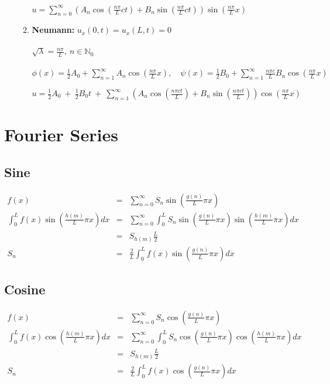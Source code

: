\documentclass[12pt]{article}
\newcommand\bitalicmath{\mathversion{bitalic}}
\begin{document}
\begin{enumerate}
\begin{enumerate}
		$u =  \displaystyle\sum\limits_{n = 0}^{\infty} \left(A_n \cos(\frac{n\pi}{L}ct) + B_n\sin(\frac{n\pi}{L}ct)\right)\sin(\frac{n\pi}{L}x)$ \\
		\item {\bf Neumann: }{\bitalicmath $ u_x(0,t) = u_x(L,t) = 0$} \\ \\
		$\sqrt{\lambda} = \displaystyle \frac{n\pi}{L},\ n \in \mathbb{N}_0$ \\ \\
		$\phi(x) = \frac{1}{2}A_0 + \sum\limits_{n = 1}^{\infty} A_n\cos(\frac{n\pi}{L}x),\quad \psi(x) = \frac{1}{2}B_0 + \sum\limits_{n = 1}^{\infty} \frac{n\pi c}{L} B_n\cos(\frac{n\pi}{L}x)$
	
		$u =  \displaystyle\frac{1}{2}A_0\  +\  \frac{1}{2}B_0 t\  +\  \sum\limits_{n = 1}^{\infty} \left(A_n \cos(\frac{n\pi ct}{L}) + B_n\sin(\frac{n\pi ct}{L})\right)\cos(\frac{n\pi}{L}x)$ \\	
		\end{enumerate}
	\end{enumerate}
\pagebreak

\section{Fourier Series}
\subsection{Sine}
	\begin{eqnarray*}
	 f(x) &=& \displaystyle\sum\limits_{n = 0}^{\infty} S_n \sin\left(\frac{g(n)}{L}\pi x \right) \\
	 \displaystyle \int_{0}^{L} f(x)\sin\left(\frac{h(m)}{L}\pi x\right) dx &=& \sum\limits_{n = 0}^{\infty} \int_{0}^{L} S_n \sin\left(\frac{g(n)}{L}\pi x \right) \sin\left(\frac{h(m)}{L}\pi x\right) dx \\
	&=& S_{h(m)} \frac{L}{2} \\
	S_n &=&  \displaystyle \frac{2}{L} \int_{0}^{L} f(x)\sin\left(\frac{g(n)}{L}\pi x\right) dx
	\end{eqnarray*}
\subsection{Cosine}
	\begin{eqnarray*}
	 f(x) &=& \displaystyle\sum\limits_{n = 0}^{\infty} S_n \cos\left(\frac{g(n)}{L}\pi x \right) \\
	 \displaystyle \int_{0}^{L} f(x)\cos\left(\frac{h(m)}{L}\pi x\right) dx &=& \sum\limits_{n = 0}^{\infty} \int_{0}^{L} S_n \cos\left(\frac{g(n)}{L}\pi x \right) \cos\left(\frac{h(m)}{L}\pi x\right) dx \\
	&=& S_{h(m)} \frac{L}{2} \\
	S_n &=&  \displaystyle \frac{2}{L} \int_{0}^{L} f(x)\cos\left(\frac{g(n)}{L}\pi x\right) dx
	\end{eqnarray*}
\end{document}
